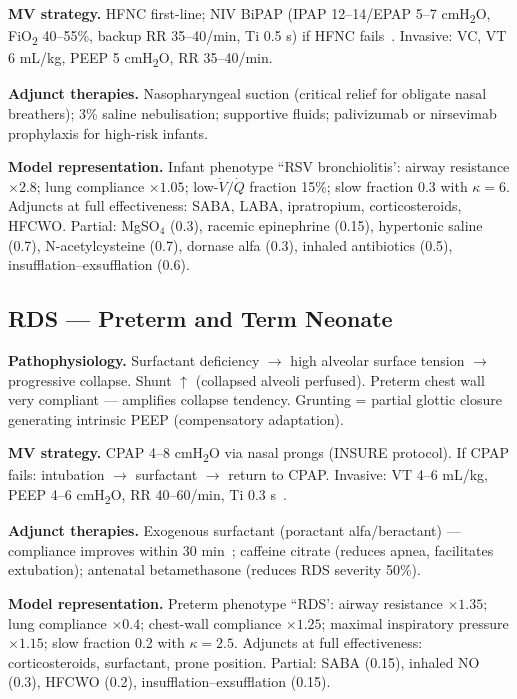\textbf{MV strategy.} HFNC first-line; NIV BiPAP (IPAP 12--14/EPAP 5--7 cmH\textsubscript{2}O, FiO\textsubscript{2} 40--55\%, backup RR 35--40/min, Ti 0.5 s) if HFNC fails~\citep{javouhey2008}. Invasive: VC, VT 6 mL/kg, PEEP 5 cmH\textsubscript{2}O, RR 35--40/min.

\textbf{Adjunct therapies.} Nasopharyngeal suction (critical relief for obligate nasal breathers); 3\% saline nebulisation; supportive fluids; palivizumab or nirsevimab prophylaxis for high-risk infants.

\textbf{Model representation.} Infant phenotype ``RSV bronchiolitis': airway resistance $\times2.8$; lung compliance $\times1.05$; low-$\dot V/\dot Q$ fraction 15\%; slow fraction 0.3 with $\kappa=6$. Adjuncts at full effectiveness: SABA, LABA, ipratropium, corticosteroids, HFCWO. Partial: MgSO$_4$ (0.3), racemic epinephrine (0.15), hypertonic saline (0.7), N-acetylcysteine (0.7), dornase alfa (0.3), inhaled antibiotics (0.5), insufflation--exsufflation (0.6).

\subsection{RDS --- Preterm and Term Neonate}
\textbf{Pathophysiology.} Surfactant deficiency $\to$ high alveolar surface tension $\to$ progressive collapse. Shunt $\uparrow$ (collapsed alveoli perfused). Preterm chest wall very compliant  --- amplifies collapse tendency. Grunting = partial glottic closure generating intrinsic PEEP (compensatory adaptation).

\textbf{MV strategy.} CPAP 4--8 cmH\textsubscript{2}O via nasal prongs (INSURE protocol). If CPAP fails: intubation $\to$ surfactant $\to$ return to CPAP. Invasive: VT 4--6 mL/kg, PEEP 4--6 cmH\textsubscript{2}O, RR 40--60/min, Ti 0.3 s~\citep{sweet2022}.

\textbf{Adjunct therapies.} Exogenous surfactant (poractant alfa/beractant) --- compliance improves within 30 min~\citep{engle2008}; caffeine citrate (reduces apnea, facilitates extubation); antenatal betamethasone (reduces RDS severity 50\%).

\textbf{Model representation.} Preterm phenotype ``RDS': airway resistance $\times1.35$; lung compliance $\times0.4$; chest-wall compliance $\times1.25$; maximal inspiratory pressure $\times1.15$; slow fraction 0.2 with $\kappa=2.5$. Adjuncts at full effectiveness: corticosteroids, surfactant, prone position. Partial: SABA (0.15), inhaled NO (0.3), HFCWO (0.2), insufflation--exsufflation (0.15).

